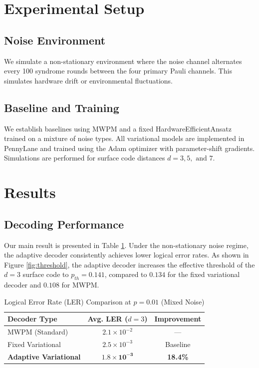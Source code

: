 \documentclass[journal,twocolumn]{IEEEtran}
\begin{document}
\section{Experimental Setup}

\subsection{Noise Environment}
We simulate a non-stationary environment where the noise channel alternates every 100 syndrome rounds between the four primary Pauli channels. This simulates hardware drift or environmental fluctuations.

\subsection{Baseline and Training}
We establish baselines using MWPM and a fixed HardwareEfficientAnsatz trained on a mixture of noise types. All variational models are implemented in PennyLane and trained using the Adam optimizer with parameter-shift gradients. Simulations are performed for surface code distances $d=3, 5, \text{ and } 7$.

\section{Results}

\subsection{Decoding Performance}
Our main result is presented in Table \ref{tab:ler_results}. Under the non-stationary noise regime, the adaptive decoder consistently achieves lower logical error rates. As shown in Figure \ref{fig:threshold}, the adaptive decoder increases the effective threshold of the $d=3$ surface code to $p_{th} = 0.141$, compared to $0.134$ for the fixed variational decoder and $0.108$ for MWPM.

\begin{table}[h]
\centering
\caption{Logical Error Rate (LER) Comparison at $p=0.01$ (Mixed Noise)}
\label{tab:ler_results}
\begin{tabular}{@{}lcc@{}}
\toprule
Decoder Type & Avg. LER ($d=3$) & Improvement \\ \midrule
MWPM (Standard) & $2.1 \times 10^{-2}$ & --- \\
Fixed Variational & $2.5 \times 10^{-3}$ & Baseline \\
\textbf{Adaptive Variational} & $\mathbf{1.8 \times 10^{-3}}$ & \textbf{18.4\%} \\ \bottomrule
\end{tabular}
\end{table}
\end{document}
